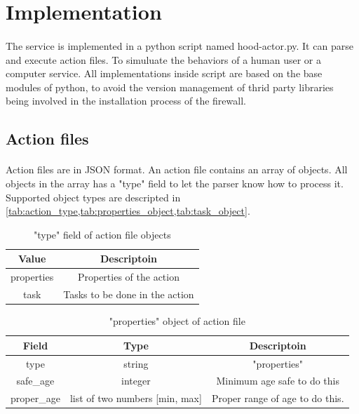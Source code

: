 \documentclass[mscthesis]{usiinfthesis}
\begin{document}
\section{Implementation}
\paragraph{}
The service is implemented in a python script named hood-actor.py. It can parse and execute action files. To simuluate the behaviors of a human user or a computer service. All implementations inside script are based on the base modules of python, to avoid the version management of thrid party libraries being involved in the installation process of the firewall.

\subsection{Action files}
\paragraph{}
Action files are in JSON format. An action file contains an array of objects. All objects in the array has a "type" field to let the parser know how to process it. Supported object types are descripted in \cref{tab:action_type,tab:properties_object,tab:task_object}.

\begin{table}[H]
  \centering
  \begin{tabular}{|c|c|}
    \hline
    Value      & Descriptoin                    \\
    \hline
    properties & Properties of the action       \\
    task       & Tasks to be done in the action \\
    \hline
  \end{tabular}
  \caption{"type" field of action file objects}
  \label{tab:action_type}
\end{table}


\begin{table}[H]
  \centering
  \begin{tabular}{|c|c|c|}
    \hline
    Field       & Type                           & Descriptoin                     \\
    \hline
    type        & string                         & "properties"                    \\
    safe\_age   & integer                        & Minimum age safe to do this     \\
    proper\_age & list of two numbers [min, max] & Proper range of age to do this. \\
    \hline
  \end{tabular}
  \caption{"properties" object of action file}
  \label{tab:properties_object}
\end{table}
\end{document}
